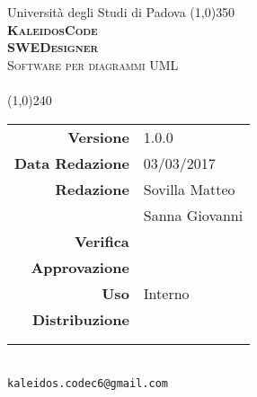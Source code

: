 \documentclass[a4paper,12pt]{article}
\author{KaleidosCode}
\date{03/03/2017}	%
\begin{document}
	\begin{titlepage}
		\centering Università degli Studi di Padova
		\line(1,0){350}\\
		\vspace{0.4cm}
		{\bfseries\scshape\LARGE KaleidosCode\\}
		\vspace{0.4cm}
		{\bfseries\scshape\LARGE SWEDesigner\\}
		{\scshape\Large Software per diagrammi UML\\}
		\vspace{1cm}
		{\scshape\Large \normediprogettoi\ \\}		%
		\vspace{1.4cm}
		\logo
		\vspace{1.2cm}
		\line(1,0){240}\\
		\begin{tabular}{r|l}
			{\hfill \textbf{Versione}} 			& 1.0.0\\
			{\hfill \textbf{Data Redazione}} 	& 03/03/2017\\	%
			{\hfill \textbf{Redazione}} 		& Sovilla Matteo \\ & Sanna Giovanni \\
			{\hfill \textbf{Verifica}} 			& \\
			{\hfill \textbf{Approvazione}} 		& \\
			{\hfill \textbf{Uso}} 				& Interno\\
			{\hfill \textbf{Distribuzione}} 	& \vardanega \\ & \cardin \\ & \proponente\\
		\end{tabular}\\
		\vspace{2cm}
		\texttt{kaleidos.codec6@gmail.com}
	\end{titlepage}

	\pagestyle{myfront}
	\newpage
		
	\newpage
		\tableofcontents
	\pagestyle{mymain}
	\newpage
		
	\newpage
		
	\newpage
		
	\newpage
		
	\newpage
		
	\label{LastPage}
\end{document}
